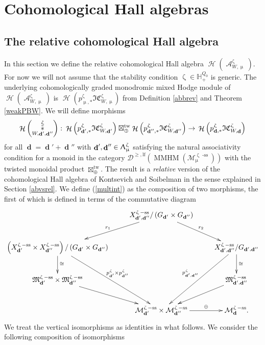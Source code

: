 \documentclass[a4paper,10pt]{amsart}
\renewcommand{\zeta}{\upzeta}
\renewcommand{\Lambda}{\Uplambda}
\renewcommand{\mu}{\upmu}
\newcommand{\Mst}{\mathfrak{M}}
\newcommand{\Msp}{\mathcal{M}}
\newcommand{\ICSt}{\mathfrak{IC}}
\DeclareMathOperator{\sst}{-ss}
\DeclareMathOperator{\tw}{tw}
\DeclareMathOperator{\MMHM}{MMHM}
\DeclareMathOperator{\ms}{\tilde{\ast}}
\DeclareMathOperator{\dd}{\mathbf{d}}
\DeclareMathOperator{\Ho}{\mathcal{H}}
\DeclareMathOperator{\Coha}{\mathcal{A}}
\newcommand{\Dulf}{\mathcal{D}^{\geq, \mathrm{lf}}}
\begin{document}
\section{Cohomological Hall algebras}
\label{CoHAsec}
\subsection{The relative cohomological Hall algebra}
\label{relc}
In this section we define the relative cohomological Hall algebra $\Ho(\Coha_{W,\mu}^{\zeta})$.  For now we will not assume that the stability condition $\zeta\in\mathbb{H}_+^{Q_0}$ is generic.  The underlying cohomologically graded monodromic mixed Hodge module of $\Ho(\Coha_{W,\mu}^{\zeta})$ is $\Ho\left(p^{\zeta}_{\mu,*}\ICSt_{W,\mu}^{\zeta}\right)$ from Definition \ref{abbrev} and Theorem \ref{weakPBW}.  We will define morphisms  
\begin{equation}
\label{multint}
\Ho\left(\ms_{W,\dd',\dd''}^{\zeta}\right)\colon\Ho\left(p^{\zeta}_{\dd',*}\ICSt_{W,\dd'}^{\zeta}\right)\boxtimes^{\tw}_{\oplus} \Ho\left(p^{\zeta}_{\dd'',*}\ICSt_{W,\dd''}^{\zeta}\right)\rightarrow\\   \Ho\left(p^{\zeta}_{\dd,*} \ICSt_{W,\dd}^{\zeta}\right)
\end{equation}
for all $\dd=\dd'+\dd''$ with $\dd',\dd''\in\Lambda_{\mu}^{\zeta}$ satisfying the natural associativity condition for a monoid in the category $\Dulf(\MMHM(\Msp^{\zeta\sst}_{\mu}))$ with the twisted monoidal product $\boxtimes^{\tw}_{\oplus}$.  The result is a \textit{relative} version of the cohomological Hall algebra of Kontsevich and Soibelman \cite{KS2} in the sense explained in Section \ref{abvsrel}.
\smallbreak
We define (\ref{multint}) as the composition of two morphisms, the first of which is defined in terms of the commutative diagram
\[
\xymatrix{
&X^{\zeta\sst}_{\dd',\dd''}/\left(G_{\dd'}\times G_{\dd''}\right)\ar[dl]_{r_1}\ar[dr]^{r_2}\\
\left(X_{\dd'}^{\zeta\sst}\times X_{\dd''}^{\zeta\sst}\right)/\left(G_{\dd'}\times G_{\dd''}\right)\ar[ddr]^{p_{\dd'}^{\zeta}\times p_{\dd''}^{\zeta}}\ar[d]^{\cong} &&X_{\dd',\dd''}^{\zeta\sst}/G_{\dd',\dd''}\ar[d]^{\cong}\ar[ddl]_{p_{\dd',\dd''}^{\zeta}}\\
\Mst_{\dd'}^{\zeta\sst}\times\Mst_{\dd''}^{\zeta\sst}\ar[dr]&&\Mst_{\dd',\dd''}^{\zeta\sst}\ar[dl]\\
&\Msp^{\zeta\sst}_{\dd'}\times\Msp^{\zeta\sst}_{\dd''}\ar[r]^-{\oplus}&\Msp^{\zeta\sst}_{\dd}.
}
\]
We treat the vertical isomorphisms as identities in what follows.  We consider the following composition of isomorphisms
\end{document}
